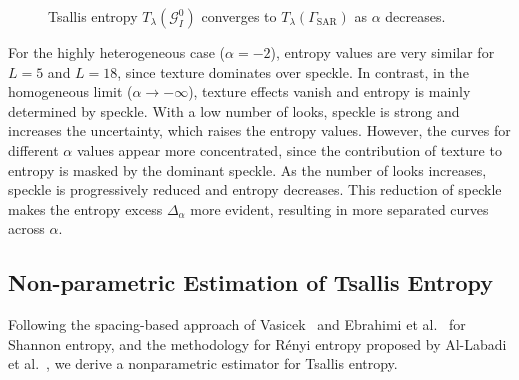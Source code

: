 \documentclass[
  lettersize  journal,
]{IEEEtran}%
\begin{document}
\begin{figure}[H]


\caption{\label{fig-tsallis-convergence_L18}Tsallis entropy
\(T_{\lambda}(\mathcal{G}^0_I)\) converges to
\(T_{\lambda}(\Gamma_{\mathrm{SAR}})\) as \(\alpha\) decreases.}

\end{figure}%

For the highly heterogeneous case (\(\alpha=-2\)), entropy values are
very similar for \(L=5\) and \(L=18\), since texture dominates over
speckle. In contrast, in the homogeneous limit (\(\alpha \to -\infty\)),
texture effects vanish and entropy is mainly determined by speckle. With
a low number of looks, speckle is strong and increases the uncertainty,
which raises the entropy values. However, the curves for different
\(\alpha\) values appear more concentrated, since the contribution of
texture to entropy is masked by the dominant speckle. As the number of
looks increases, speckle is progressively reduced and entropy decreases.
This reduction of speckle makes the entropy excess \(\Delta_\alpha\)
more evident, resulting in more separated curves across \(\alpha\).

\subsection{Non-parametric Estimation of Tsallis
Entropy}\label{non-parametric-estimation-of-tsallis-entropy}

\label{subsec:tsallis-np}

Following the spacing-based approach of
Vasicek~ and Ebrahimi et
al.~ for Shannon entropy, and the
methodology for Rényi entropy proposed by Al-Labadi et
al.~, we derive a nonparametric
estimator for Tsallis entropy.
\end{document}
